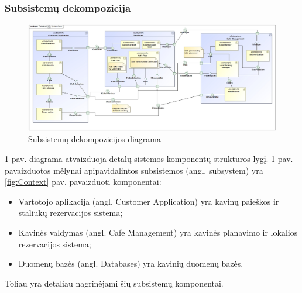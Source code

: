 \documentclass{VUMIFPSkursinis}
\begin{document}
\begin{landscape}
\subsubsection{Subsistemų dekompozicija}
	\begin {figure}[H]
		\includegraphics[width=1.67\textwidth,height=1.67\textheight,keepaspectratio]{img/SystemCore}
		\caption{Subsistemų dekompozicijos diagrama}
		\label{fig:System Core}
	\end{figure}
\end{landscape}

\ref {fig:System Core} pav. diagrama atvaizduoja detalų sistemos komponentų struktūros lygį. \ref {fig:System Core} pav. pavaizduotos mėlynai apipavidalintos subsistemos (angl. subsystem) yra \ref {fig:Context} pav. pavaizduoti komponentai:
\begin{itemize}
  \item Vartotojo aplikacija (angl. Customer Application) yra kavinų paieškos ir staliukų rezervacijos sistema;
  \item Kavinės valdymas (angl. Cafe Management) yra kavinės planavimo ir lokalios rezervacijos sistema;
  \item Duomenų bazės (angl. Databases) yra kavinių duomenų bazės.
\end{itemize}
Toliau yra detaliau nagrinėjami šių subsistemų komponentai.\\
\end{document}
